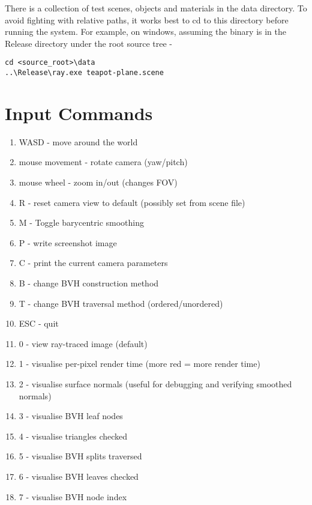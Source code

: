 There is a collection of test scenes, objects and materials in the data directory. To avoid fighting with relative paths, it works best to cd to this directory before running the system. For example, on windows, assuming the binary is in the Release directory under the root source tree - 

\verb|cd <source_root>\data| \\
\verb|..\Release\ray.exe teapot-plane.scene|

\section{Input Commands}
    \begin{enumerate}
    \item WASD - move around the world
    \item mouse movement - rotate camera (yaw/pitch)
    \item mouse wheel - zoom in/out (changes FOV)
    \item R - reset camera view to default (possibly set from scene file)
    \item M - Toggle barycentric smoothing
    \item P - write screenshot image
    \item C - print the current camera parameters
    \item B - change BVH construction method
    \item T - change BVH traversal method (ordered/unordered)
    \item ESC - quit
    \item 0 - view ray-traced image (default)
    \item 1 - visualise per-pixel render time (more red = more render time)
    \item 2 - visualise surface normals (useful for debugging and verifying smoothed normals)
    \item 3 - visualise BVH leaf nodes
    \item 4 - visualise triangles checked
    \item 5 - visualise BVH splits traversed
    \item 6 - visualise BVH leaves checked 
    \item 7 - visualise BVH node index
    \end{enumerate}

